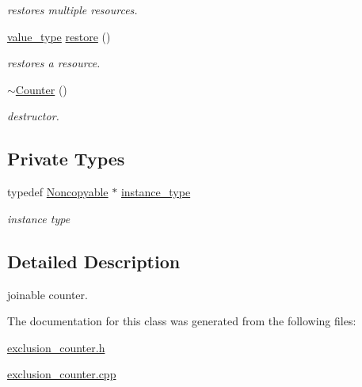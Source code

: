 \begin{DoxyCompactItemize}
\begin{DoxyCompactList}\small\item\em restores multiple resources. \end{DoxyCompactList}\item 
\hypertarget{classhryky_1_1exclusion_1_1_counter_af1e531673f38e004002c04aeeabbd7fc}{\hyperlink{classhryky_1_1exclusion_1_1_counter_ab326191a15b6c67f8071a7a2b138d1f0}{value\-\_\-type} \hyperlink{classhryky_1_1exclusion_1_1_counter_af1e531673f38e004002c04aeeabbd7fc}{restore} ()}\label{classhryky_1_1exclusion_1_1_counter_af1e531673f38e004002c04aeeabbd7fc}

\begin{DoxyCompactList}\small\item\em restores a resource. \end{DoxyCompactList}\item 
\hypertarget{classhryky_1_1exclusion_1_1_counter_a17ecda1cade5fd3193aad89f99546ab0}{\hyperlink{classhryky_1_1exclusion_1_1_counter_a17ecda1cade5fd3193aad89f99546ab0}{$\sim$\-Counter} ()}\label{classhryky_1_1exclusion_1_1_counter_a17ecda1cade5fd3193aad89f99546ab0}

\begin{DoxyCompactList}\small\item\em destructor. \end{DoxyCompactList}\end{DoxyCompactItemize}
\subsection*{Private Types}
\begin{DoxyCompactItemize}
\item 
\hypertarget{classhryky_1_1_noncopyable_aaf87abb55f700af85ecb0895f6178821}{typedef \hyperlink{classhryky_1_1_noncopyable}{Noncopyable} $\ast$ \hyperlink{classhryky_1_1_noncopyable_aaf87abb55f700af85ecb0895f6178821}{instance\-\_\-type}}\label{classhryky_1_1_noncopyable_aaf87abb55f700af85ecb0895f6178821}

\begin{DoxyCompactList}\small\item\em instance type \end{DoxyCompactList}\end{DoxyCompactItemize}


\subsection{Detailed Description}
joinable counter. 

The documentation for this class was generated from the following files\-:\begin{DoxyCompactItemize}
\item 
\hyperlink{exclusion__counter_8h}{exclusion\-\_\-counter.\-h}\item 
\hyperlink{exclusion__counter_8cpp}{exclusion\-\_\-counter.\-cpp}\end{DoxyCompactItemize}
